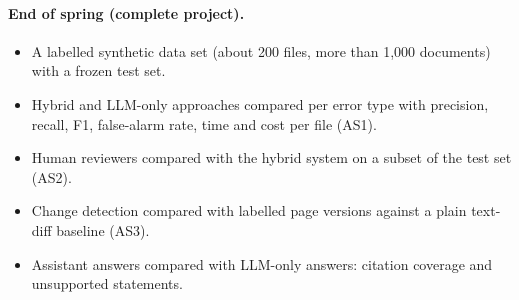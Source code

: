 \paragraph{End of spring (complete project).}
\begin{itemize}
  \item A labelled synthetic data set (about 200 files, more than 1,000 documents) with a frozen
    test set.
  \item Hybrid and LLM-only approaches compared per error type with precision, recall, F1,
    false-alarm rate, time and cost per file (AS1).
  \item Human reviewers compared with the hybrid system on a subset of the test set (AS2).
  \item Change detection compared with labelled page versions against a plain text-diff baseline
    (AS3).
  \item Assistant answers compared with LLM-only answers: citation coverage and unsupported
    statements.
\end{itemize}
